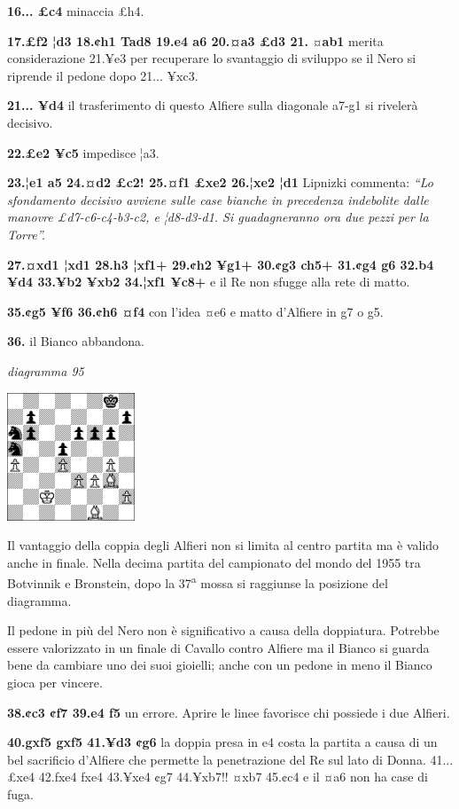 \documentclass[
]{article}
\begin{document}
\textbf{16... £c4} minaccia £h4.

\textbf{17.£f2 ¦d3 18.¢h1 Tad8 19.e4 a6 20.¤a3 £d3 21.} ¤\textbf{ab1}
merita considerazione 21.¥e3 per recuperare lo svantaggio di sviluppo se
il Nero si riprende il pedone dopo 21... ¥xc3.

\textbf{21... ¥d4} il trasferimento di questo Alfiere sulla diagonale
a7-g1 si rivelerà decisivo.

\textbf{22.£e2 ¥c5} impedisce ¦a3.

\textbf{23.¦e1 a5 24.¤d2 £c2! 25.¤f1 £xe2 26.¦xe2 ¦d1} Lipnizki
commenta: \emph{``Lo sfondamento decisivo avviene sulle case bianche in
precedenza indebolite dalle manovre £d7-c6-c4-b3-c2, e ¦d8-d3-d1. Si
guadagneranno ora due pezzi per la Torre''.}

\textbf{27.¤xd1 ¦xd1 28.h3 ¦xf1+ 29.¢h2 ¥g1+ 30.¢g3 ch5+ 31.¢g4 g6 32.b4
¥d4 33.¥b2 ¥xb2 34.¦xf1 ¥c8+} e il Re non sfugge alla rete di matto.

\textbf{35.¢g5 ¥f6 36.¢h6 ¤f4} con l'idea ¤e6 e matto d'Alfiere in g7 o
g5.

\textbf{36.} il Bianco abbandona.

\emph{diagramma 95}

\includegraphics[width=1.5in,height=1.5in]{vertopal_109f12be458a423d8f3cc838880eaea2/media/image95.png}

Il vantaggio della coppia degli Alfieri non si limita al centro partita
ma è valido anche in finale. Nella decima partita del campionato del
mondo del 1955 tra Botvinnik e Bronstein, dopo la 37\textsuperscript{a}
mossa si raggiunse la posizione del diagramma.

Il pedone in più del Nero non è significativo a causa della doppiatura.
Potrebbe essere valorizzato in un finale di Cavallo contro Alfiere ma il
Bianco si guarda bene da cambiare uno dei suoi gioielli; anche con un
pedone in meno il Bianco gioca per vincere.

\textbf{38.¢c3 ¢f7 39.e4 f5} un errore. Aprire le linee favorisce chi
possiede i due Alfieri.

\textbf{40.gxf5 gxf5 41.¥d3 ¢g6} la doppia presa in e4 costa la partita
a causa di un bel sacrificio d'Alfiere che permette la penetrazione del
Re sul lato di Donna. 41... £xe4 42.fxe4 fxe4 43.¥xe4 ¢g7 44.¥xb7!! ¤xb7
45.¢c4 e il ¤a6 non ha case di fuga.
\end{document}
